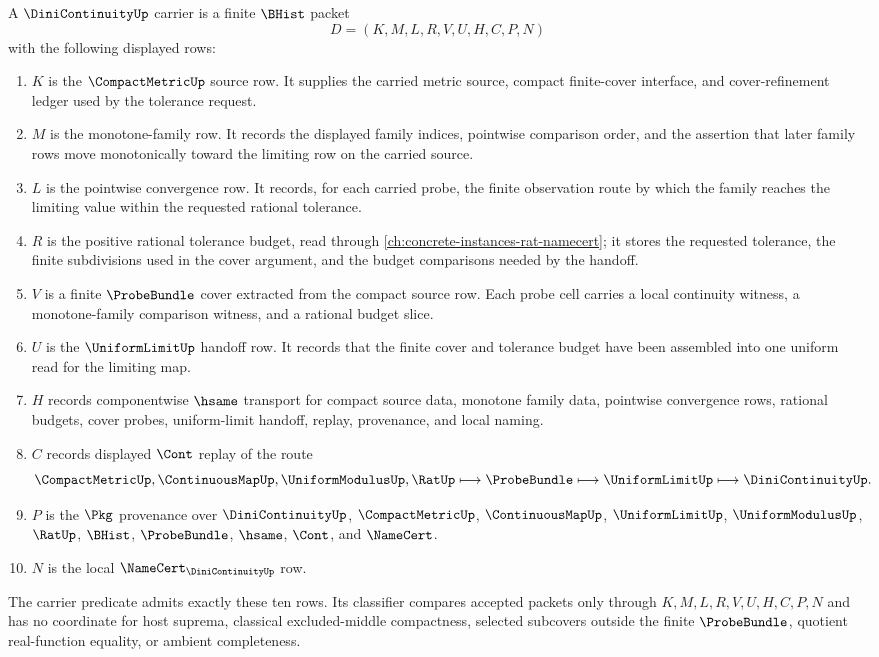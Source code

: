 \begin{definition}
\label{def:dini-continuity-carrier}
A $\DiniContinuityUp$ carrier is a finite $\BHist$ packet
$$
D=(K,M,L,R,V,U,H,C,P,N)
$$
with the following displayed rows:
\begin{enumerate}
\item $K$ is the $\CompactMetricUp$ source row. It supplies the carried metric source, compact finite-cover interface, and cover-refinement ledger used by the tolerance request.
\item $M$ is the monotone-family row. It records the displayed family indices, pointwise comparison order, and the assertion that later family rows move monotonically toward the limiting row on the carried source.
\item $L$ is the pointwise convergence row. It records, for each carried probe, the finite observation route by which the family reaches the limiting value within the requested rational tolerance.
\item $R$ is the positive rational tolerance budget, read through \autoref{ch:concrete-instances-rat-namecert}; it stores the requested tolerance, the finite subdivisions used in the cover argument, and the budget comparisons needed by the handoff.
\item $V$ is a finite $\ProbeBundle$ cover extracted from the compact source row. Each probe cell carries a local continuity witness, a monotone-family comparison witness, and a rational budget slice.
\item $U$ is the $\UniformLimitUp$ handoff row. It records that the finite cover and tolerance budget have been assembled into one uniform read for the limiting map.
\item $H$ records componentwise $\hsame$ transport for compact source data, monotone family data, pointwise convergence rows, rational budgets, cover probes, uniform-limit handoff, replay, provenance, and local naming.
\item $C$ records displayed $\Cont$ replay of the route
$$
\CompactMetricUp,\ContinuousMapUp,\UniformModulusUp,\RatUp
\longmapsto
\ProbeBundle
\longmapsto
\UniformLimitUp
\longmapsto
\DiniContinuityUp .
$$
\item $P$ is the $\Pkg$ provenance over $\DiniContinuityUp$, $\CompactMetricUp$, $\ContinuousMapUp$, $\UniformLimitUp$, $\UniformModulusUp$, $\RatUp$, $\BHist$, $\ProbeBundle$, $\hsame$, $\Cont$, and $\NameCert$.
\item $N$ is the local $\NameCert_{\DiniContinuityUp}$ row.
\end{enumerate}
The carrier predicate admits exactly these ten rows. Its classifier compares accepted packets only through $K,M,L,R,V,U,H,C,P,N$ and has no coordinate for host suprema, classical excluded-middle compactness, selected subcovers outside the finite $\ProbeBundle$, quotient real-function equality, or ambient completeness.
\end{definition}

